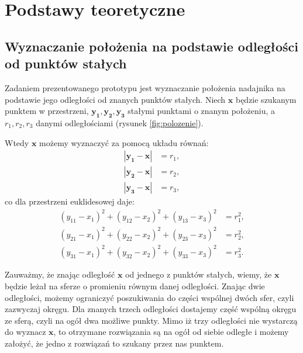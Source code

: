\chapter{Podstawy teoretyczne}
\section{Wyznaczanie położenia na podstawie odległości od punktów stałych}

Zadaniem prezentowanego prototypu jest wyznaczanie położenia nadajnika na podstawie jego 
odległości od znanych punktów stałych. Niech $\boldsymbol{x}$ będzie szukanym punktem w przestrzeni,
$\boldsymbol{y_1,y_2,y_3}$ stałymi punktami o znanym położeniu, a $r_1,r_2,r_3$ danymi odległościami
(rysunek \ref{fig:polozenie}).

Wtedy $\boldsymbol{x}$ możemy wyznaczyć za pomocą układu równań:
 \begin{align}
    \nonumber |\boldsymbol{y_1} - \boldsymbol{x}| &= r_1,
 \\ \nonumber |\boldsymbol{y_2} - \boldsymbol{x}| &= r_2,
 \\ \nonumber |\boldsymbol{y_3} - \boldsymbol{x}| &= r_3,
 \end{align}
co dla przestrzeni euklidesowej daje:
 \begin{align}  
    \nonumber   (y_{11}-x_1)^2 + (y_{12}-x_2)^2 + (y_{13}-x_3)^2 &= r_1^2,
 \\ \nonumber   (y_{21}-x_1)^2 + (y_{22}-x_2)^2 + (y_{23}-x_3)^2 &= r_2^2,
 \\ \nonumber   (y_{31}-x_1)^2 + (y_{32}-x_2)^2 + (y_{33}-x_3)^2 &= r_3^2.
 \end{align}

Zauważmy, że znając odległość $\boldsymbol{x}$ od jednego z punktów stałych, wiemy, że $\boldsymbol{x}$ będzie leżał na
sferze o promieniu równym danej odległości. Znając dwie odległości, możemy ograniczyć poszukiwania do części wspólnej dwóch sfer,
czyli zazwyczaj okręgu. Dla znanych trzech odległości dostajemy część wspólną okręgu ze sferą, czyli na ogół dwa możliwe punkty.
Mimo iż trzy odległości nie wystarczą do wyznacz $\boldsymbol{x}$, 
to otrzymane rozwiązania są na ogół od siebie odległe i 
możemy założyć, że jedno z rozwiązań to szukany przez nas punktem.

